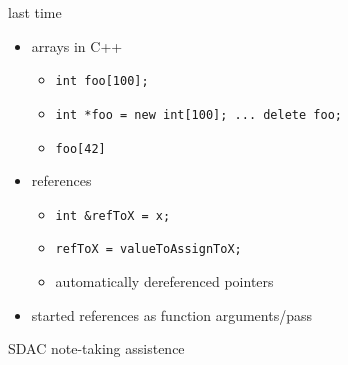 \begin{frame}[fragile,label=lastTime]{last time}
\lstset{language=C++,style=small}
    \begin{itemize}
    \item arrays in C++
        \begin{itemize}
        \item \lstinline|int foo[100];|
        \item \lstinline|int *foo = new int[100]; ... delete foo;|
        \item \lstinline|foo[42]|
        \end{itemize}
    \item references
        \begin{itemize}
        \item \lstinline|int &refToX = x;|
        \item \lstinline|refToX = valueToAssignToX;|
        \item automatically dereferenced pointers
        \end{itemize}
    \item started references as function arguments/pass
    \end{itemize}
\end{frame}

\begin{frame}{SDAC note-taking assistence}
\end{frame}
